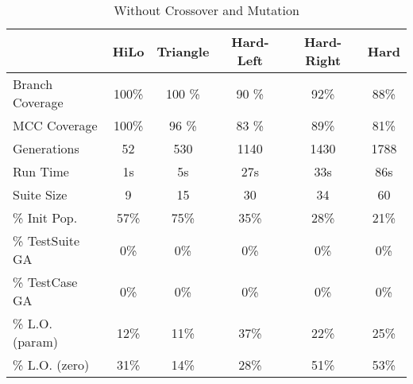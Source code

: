 \documentclass[runningheads]{llncs}
\begin{document}
\begin{table}[h!]
	\begin{center}
		
		\def\arraystretch{1.3}%
		\setlength\tabcolsep{1em}
		\begin{tabular}{| l | c  c  c  c c |}
			\hline
						     & HiLo  		 & Triangle		& Hard-Left	& 	Hard-Right 		& Hard		\\ \hline
			Branch Coverage	 & 100\%         & 100	\%      & 90 \%      	& 92\%          & 88\%      \\ \hline
			MCC Coverage	 & 100\%         & 96 \%        & 83 \%      	& 89\%          & 81\%      \\ \hline
			Generations		 & 52          	 & 530          & 1140       	& 1430          & 1788      \\ \hline
			Run Time		 & 1s          	 & 5s           & 27s       	& 33s          	& 86s       \\ \hhline{|=|=====|}
																
			Suite Size       & 9        	& 15       	 	& 30			& 34          	& 60        \\ \hline
			\% Init Pop.     & 57\%         & 75\%       	& 35\%       	& 28\%         	& 21\%      \\ \hline
			\% TestSuite GA  & 0\%          & 0\%       	& 0\%			& 0\%          	& 0\%       \\ \hline
			\% TestCase  GA  & 0\%          & 0\%       	& 0\%      		& 0\%         	& 0\%       \\ \hline
			\% 	L.O. (param) & 12\%         & 11\%       	& 37\%       	& 22\%          & 25\%      \\ \hline
			\% L.O. (zero)	 & 31\%         & 14\%      	& 28\%       	& 51\%          & 53\%      \\ \hline
		\end{tabular}
	\end{center}
	\caption{Without Crossover and Mutation}  
	\label{tab:CovAll}
\end{table}
\end{document}
